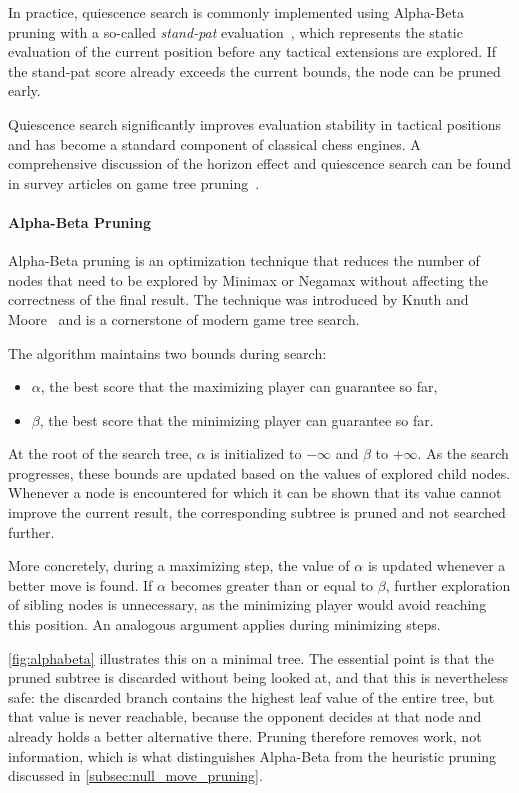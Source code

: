 In practice, quiescence search is commonly implemented using Alpha-Beta pruning
with a so-called \emph{stand-pat} evaluation~\cite{marsland1986review}, which
represents the static evaluation of the current position before any tactical
extensions are explored. If the stand-pat score already exceeds the current
bounds, the node can be pruned early.

Quiescence search significantly improves evaluation stability in tactical
positions and has become a standard component of classical chess engines. A
comprehensive discussion of the horizon effect and quiescence search can be
found in survey articles on game tree pruning~\cite{marsland1986review}.

\paragraph{Alpha-Beta Pruning}
Alpha-Beta pruning is an optimization technique that reduces the number of nodes
that need to be explored by Minimax or Negamax without affecting the correctness
of the final result. The technique was introduced by Knuth and Moore~\cite{knuth1975alphabeta}
and is a cornerstone of modern game tree search.

The algorithm maintains two bounds during search:
\begin{itemize}
    \item $\alpha$, the best score that the maximizing player can guarantee so
    far,
    \item $\beta$, the best score that the minimizing player can guarantee so
    far.
\end{itemize}

At the root of the search tree, $\alpha$ is initialized to $-\infty$ and $\beta$
to $+\infty$. As the search progresses, these bounds are updated based on the
values of explored child nodes. Whenever a node is encountered for which it can
be shown that its value cannot improve the current result, the corresponding
subtree is pruned and not searched further.

More concretely, during a maximizing step, the value of $\alpha$ is updated
whenever a better move is found. If $\alpha$ becomes greater than or equal to
$\beta$, further exploration of sibling nodes is unnecessary, as the minimizing
player would avoid reaching this position. An analogous argument applies during
minimizing steps.

\cref{fig:alphabeta} illustrates this on a minimal tree. The essential point is
that the pruned subtree is discarded without being looked at, and that this is
nevertheless safe: the discarded branch contains the highest leaf value of the
entire tree, but that value is never reachable, because the opponent decides at
that node and already holds a better alternative there. Pruning therefore removes
work, not information, which is what distinguishes Alpha-Beta from the heuristic
pruning discussed in \cref{subsec:null_move_pruning}.

